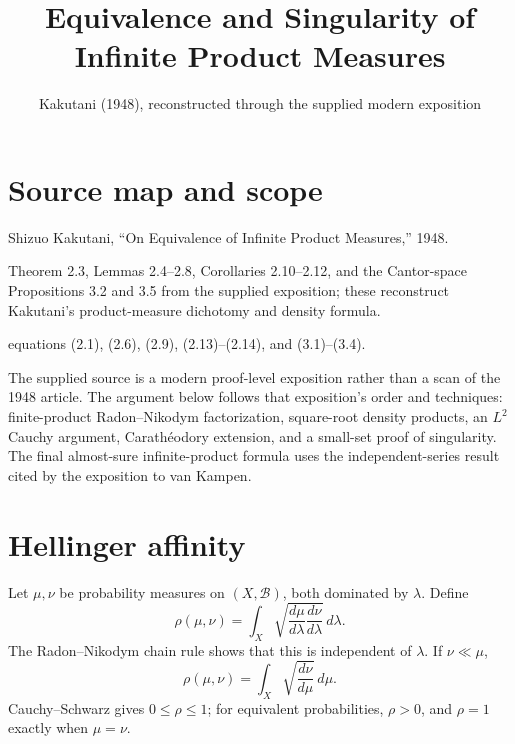 
\title{Equivalence and Singularity of Infinite Product Measures}
\author{}
\date{Kakutani (1948), reconstructed through the supplied modern exposition}

\maketitle

\section*{Source map and scope}
\begin{description}[style=nextline,leftmargin=3.2cm,labelwidth=3cm]
\item[Primary paper] Shizuo Kakutani, ``On Equivalence of Infinite Product Measures,'' 1948.
\item[Local detailed source] \texttt{}
\item[Coverage] Theorem 2.3, Lemmas 2.4--2.8, Corollaries 2.10--2.12, and the Cantor-space Propositions 3.2 and 3.5 from the supplied exposition; these reconstruct Kakutani's product-measure dichotomy and density formula.
\item[Source anchors] equations (2.1), (2.6), (2.9), (2.13)--(2.14), and (3.1)--(3.4).
\end{description}

The supplied source is a modern proof-level exposition rather than a scan of the 1948 article.  The
argument below follows that exposition's order and techniques: finite-product Radon--Nikodym
factorization, square-root density products, an \(L^2\) Cauchy argument, Carath\'eodory extension,
and a small-set proof of singularity.  The final almost-sure infinite-product formula uses the
independent-series result cited by the exposition to van Kampen.

\section{Hellinger affinity}
Let \(\mu,\nu\) be probability measures on \((X,\mathcal B)\), both dominated by \(\lambda\).  Define
\begin{equation}\label{eq:kak-rho}
 \rho(\mu,\nu)=\int_X
 \sqrt{\frac{d\mu}{d\lambda}\frac{d\nu}{d\lambda}}\,d\lambda.
\end{equation}
The Radon--Nikodym chain rule shows that this is independent of \(\lambda\).  If \(\nu\ll\mu\),
\begin{equation}\label{eq:kak-rho-rn}
 \rho(\mu,\nu)=\int_X\sqrt{\frac{d\nu}{d\mu}}\,d\mu.
\end{equation}
Cauchy--Schwarz gives \(0\le\rho\le1\); for equivalent probabilities, \(\rho>0\), and
\(\rho=1\) exactly when \(\mu=\nu\).

